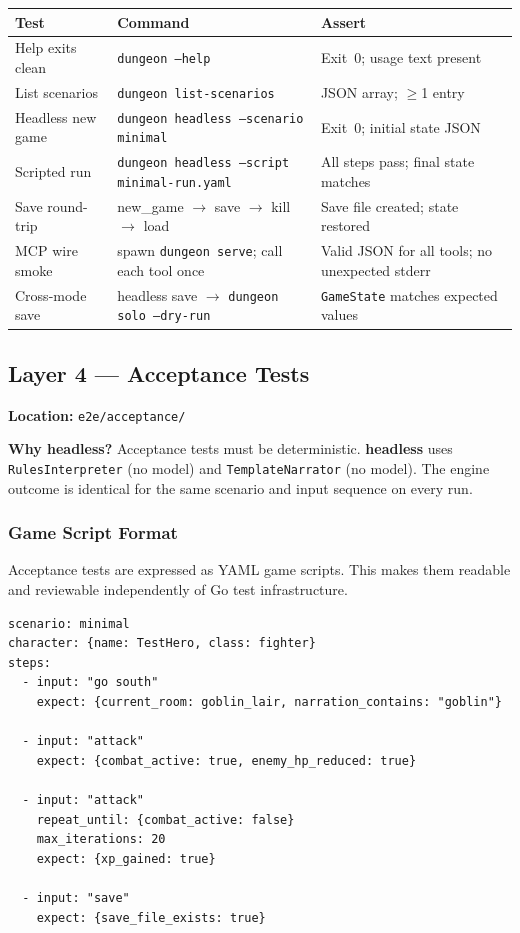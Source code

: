 \documentclass[a4paper,10pt]{article}
\newcommand{\cmd}[1]{\texttt{#1}}
\newcommand{\mode}[1]{\textbf{#1}}
\begin{document}
\begin{center}
\begin{tabular}{lp{4.5cm}p{3.5cm}}
\toprule
\textbf{Test} & \textbf{Command} & \textbf{Assert} \\
\midrule
Help exits clean
  & \cmd{dungeon --help}
  & Exit~0; usage text present \\
List scenarios
  & \cmd{dungeon list-scenarios}
  & JSON array; $\geq$1 entry \\
Headless new game
  & \cmd{dungeon headless --scenario minimal}
  & Exit~0; initial state JSON \\
Scripted run
  & \cmd{dungeon headless --script minimal-run.yaml}
  & All steps pass; final state matches \\
Save round-trip
  & new\_game $\to$ save $\to$ kill $\to$ load
  & Save file created; state restored \\
MCP wire smoke
  & spawn \cmd{dungeon serve}; call each tool once
  & Valid JSON for all tools; no unexpected stderr \\
Cross-mode save
  & headless save $\to$ \cmd{dungeon solo --dry-run}
  & \texttt{GameState} matches expected values \\
\bottomrule
\end{tabular}
\end{center}

\subsection{Layer 4 --- Acceptance Tests}

\textbf{Location:} \texttt{e2e/acceptance/}

\textbf{Why headless?}  Acceptance tests must be deterministic.
\mode{headless} uses \texttt{RulesInterpreter} (no model) and
\texttt{TemplateNarrator} (no model).  The engine outcome is
identical for the same scenario and input sequence on every run.

\subsubsection{Game Script Format}

Acceptance tests are expressed as YAML game scripts.  This makes
them readable and reviewable independently of Go test infrastructure.

\begin{lstlisting}[title={testdata/scripts/complete-run.yaml (excerpt)}]
scenario: minimal
character: {name: TestHero, class: fighter}
steps:
  - input: "go south"
    expect: {current_room: goblin_lair, narration_contains: "goblin"}

  - input: "attack"
    expect: {combat_active: true, enemy_hp_reduced: true}

  - input: "attack"
    repeat_until: {combat_active: false}
    max_iterations: 20
    expect: {xp_gained: true}

  - input: "save"
    expect: {save_file_exists: true}
\end{lstlisting}
\end{document}
